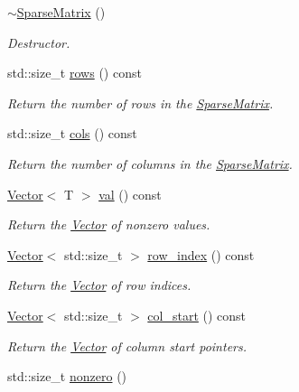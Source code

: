 \begin{DoxyCompactItemize}
\hyperlink{classLuna_1_1SparseMatrix_a19932e29b8a65748e44025611c587ccc}{$\sim$\+Sparse\+Matrix} ()
\begin{DoxyCompactList}\small\item\em Destructor. \end{DoxyCompactList}\item 
std\+::size\+\_\+t \hyperlink{classLuna_1_1SparseMatrix_a970319496e5f0b963e4810f2ecbd93b6}{rows} () const
\begin{DoxyCompactList}\small\item\em Return the number of rows in the \hyperlink{classLuna_1_1SparseMatrix}{Sparse\+Matrix}. \end{DoxyCompactList}\item 
std\+::size\+\_\+t \hyperlink{classLuna_1_1SparseMatrix_aff9e25ce05b5d11c3490f37fcd2ccfb0}{cols} () const
\begin{DoxyCompactList}\small\item\em Return the number of columns in the \hyperlink{classLuna_1_1SparseMatrix}{Sparse\+Matrix}. \end{DoxyCompactList}\item 
\hyperlink{classLuna_1_1Vector}{Vector}$<$ T $>$ \hyperlink{classLuna_1_1SparseMatrix_ac22d87e2fb618c6140c579bc72dd503b}{val} () const
\begin{DoxyCompactList}\small\item\em Return the \hyperlink{classLuna_1_1Vector}{Vector} of nonzero values. \end{DoxyCompactList}\item 
\hyperlink{classLuna_1_1Vector}{Vector}$<$ std\+::size\+\_\+t $>$ \hyperlink{classLuna_1_1SparseMatrix_a3a430b487f83ac9ef35ed322e1b94c29}{row\+\_\+index} () const
\begin{DoxyCompactList}\small\item\em Return the \hyperlink{classLuna_1_1Vector}{Vector} of row indices. \end{DoxyCompactList}\item 
\hyperlink{classLuna_1_1Vector}{Vector}$<$ std\+::size\+\_\+t $>$ \hyperlink{classLuna_1_1SparseMatrix_a5183843e7b13b0b359a9c98a91b30f6a}{col\+\_\+start} () const
\begin{DoxyCompactList}\small\item\em Return the \hyperlink{classLuna_1_1Vector}{Vector} of column start pointers. \end{DoxyCompactList}\item 
std\+::size\+\_\+t \hyperlink{classLuna_1_1SparseMatrix_a84c317800c26bc9548c66db99af09b56}{nonzero} ()

\end{DoxyCompactItemize}
